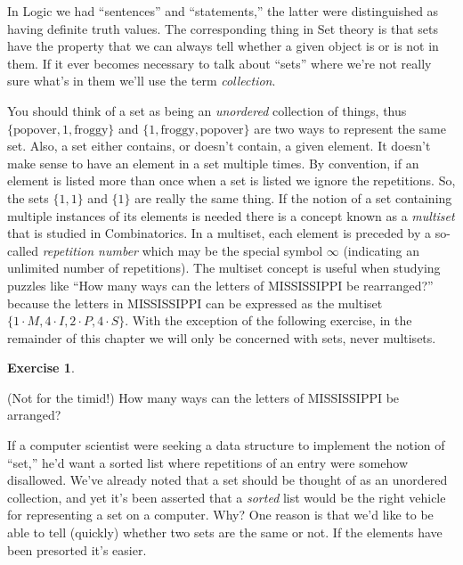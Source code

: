 \documentclass[10pt,]{book}
\theoremstyle{plain}
\theoremstyle{definition}
\theoremstyle{definition}
\newtheorem{exercise}[theorem]{Exercise}
\numberwithin{equation}{section}
\begin{document}
    In Logic we had ``sentences'' and ``statements,'' the latter were
    distinguished as having definite truth values. The corresponding
    thing in Set theory is that sets have the property that we can always
    tell whether a given object is or is not in them. If it ever becomes
    necessary to talk about ``sets'' where we're not really sure what's in
    them we'll use the term \emph{collection}.
\par

    You should think of a set as being an \emph{unordered} collection of
    things, thus \(\{ \mbox{popover} , 1, \mbox{froggy}  \}\) and
    \(\{ 1, \mbox{froggy} , \mbox{popover}  \}\) are two ways to represent the
    same set. Also, a set either contains, or doesn't contain, a given element.
    It doesn't make sense to have an element in a set multiple times. By
    convention, if an element is listed more than once when a set is
    listed we ignore the repetitions. So, the sets
    \(\{ 1, 1\}\) and \(\{1\}\) are really the same thing. If the notion
    of a set containing multiple instances of its elements is needed there
    is a concept known as a
    \emph{multiset} that is studied in Combinatorics.
    In a multiset, each element is preceded by a so-called
    \emph{repetition number}
    which may be the special symbol \(\infty\) (indicating an unlimited number
    of repetitions). The multiset concept is useful when studying puzzles like
    ``How many ways can the letters of MISSISSIPPI be rearranged?'' because the
    letters in MISSISSIPPI can be expressed as the multiset \(\{1\cdot M, 4\cdot I,
    2\cdot P, 4\cdot S \}\). With the exception of the following exercise, in the
    remainder of this chapter we will only be concerned with sets, never multisets.
\begin{exercise}\label{exercise-30}

        (Not for the timid!) How many ways can the letters of MISSISSIPPI be arranged?
\end{exercise}
\par

    If a computer scientist were seeking a data structure to implement the
    notion of ``set,'' he'd want a sorted list where repetitions of an entry
    were somehow disallowed. We've already noted that a set should be thought of
    as an unordered collection, and yet it's been asserted that a \emph{sorted}
    list would be the right vehicle for representing a set on a computer. Why?
    One reason is that we'd like to be able to tell (quickly) whether two sets
    are the same or not. If the elements have been presorted it's easier.
\par
\end{document}
